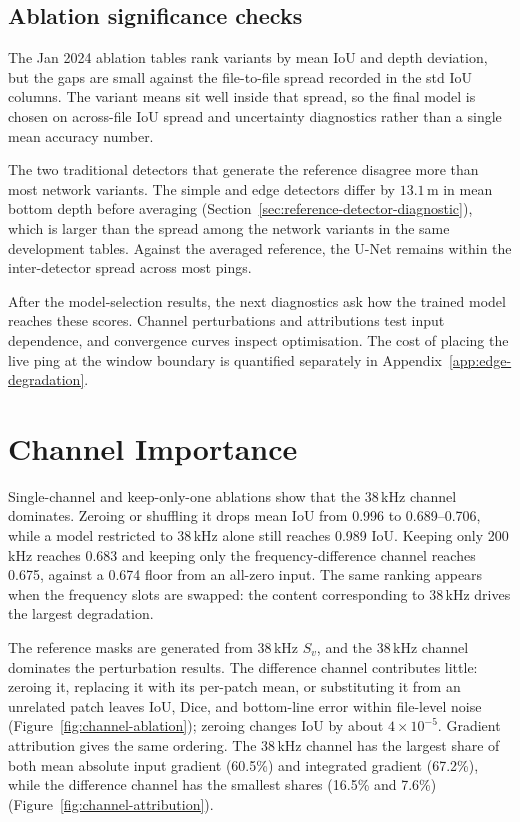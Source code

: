 \subsection{Ablation significance checks}
\label{sec:stat-validation}

The Jan 2024 ablation tables rank variants by mean IoU and depth deviation, but the gaps are small against the file-to-file spread recorded in the std IoU columns. The variant means sit well inside that spread, so the final model is chosen on across-file IoU spread and uncertainty diagnostics rather than a single mean accuracy number.

The two traditional detectors that generate the reference disagree more than most network variants. The simple and edge detectors differ by $13.1$\,m in mean bottom depth before averaging (Section~\ref{sec:reference-detector-diagnostic}), which is larger than the spread among the network variants in the same development tables. Against the averaged reference, the U-Net remains within the inter-detector spread across most pings.


After the model-selection results, the next diagnostics ask how the trained model reaches these scores. Channel perturbations and attributions test input dependence, and convergence curves inspect optimisation. The cost of placing the live ping at the window boundary is quantified separately in Appendix~\ref{app:edge-degradation}.

\section{Channel Importance}
\label{sec:channel-importance}

Single-channel and keep-only-one ablations show that the 38\,kHz channel dominates. Zeroing or shuffling it drops mean IoU from 0.996 to 0.689--0.706, while a model restricted to 38\,kHz alone still reaches 0.989 IoU. Keeping only 200\,kHz reaches 0.683 and keeping only the frequency-difference channel reaches 0.675, against a 0.674 floor from an all-zero input. The same ranking appears when the frequency slots are swapped: the content corresponding to 38\,kHz drives the largest degradation.

The reference masks are generated from 38\,kHz $S_v$, and the 38\,kHz channel dominates the perturbation results. The difference channel contributes little: zeroing it, replacing it with its per-patch mean, or substituting it from an unrelated patch leaves IoU, Dice, and bottom-line error within file-level noise (Figure~\ref{fig:channel-ablation}); zeroing changes IoU by about $4\times10^{-5}$. Gradient attribution gives the same ordering. The 38\,kHz channel has the largest share of both mean absolute input gradient (60.5\%) and integrated gradient (67.2\%), while the difference channel has the smallest shares (16.5\% and 7.6\%) (Figure~\ref{fig:channel-attribution}).

